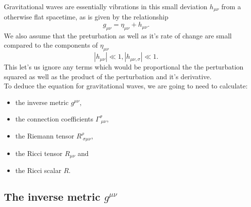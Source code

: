 
Gravitational waves are essentially vibrations in this small deviation $h_{\mu\nu}$ from a otherwise flat spacetime, as is given by the relationship
\begin{equation}
    g_{\mu\nu} = \eta_{\mu\nu} + h_{\mu\nu}.
\end{equation} 
We also assume that the preturbation as well as it's rate of change are small compared to the components of $\eta_{\mu\nu}$
\begin{equation}
    |h_{\mu\nu}| \ll 1, |h_{\mu\nu,\sigma}| \ll 1.
\end{equation}
This let's us ignore any terms which would be proportional the the perturbation squared as well as the product of the perturbation and it's 
derivative.
\\[1em]
To deduce the equation for gravitational waves, we are going to need to calculate:
\begin{itemize}
    \item the inverse metric $g^{\mu\nu}$,
    \item the connection coefficients $\Gamma^{\sigma}_{\;\mu\nu}$,
    \item the Riemann tensor $R^\rho_{\;\sigma\mu\nu}$,
    \item the Ricci tensor $R_{\mu\nu}$ and
    \item the Ricci scalar $R$.
\end{itemize}

\subsection{The inverse metric $g^{\mu\nu}$}

